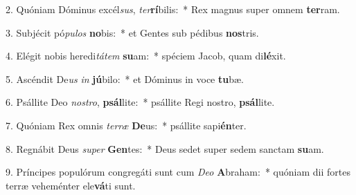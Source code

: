 2. Quóniam Dóminus excél\textit{sus}, \textit{ter}\textbf{rí}bilis:~*  Rex magnus super omnem \textbf{ter}ram.\

3. Subjécit pó\textit{pu}\textit{los} \textbf{no}bis:~*  et Gentes sub pédibus \textbf{nos}tris.\

4. Elégit nobis heredi\textit{tá}\textit{tem} \textbf{su}am:~*  spéciem Jacob, quam di\textbf{lé}xit.\

5. Ascéndit De\textit{us} \textit{in} \textbf{jú}bilo:~*  et Dóminus in voce \textbf{tu}bæ.\

6. Psállite Deo \textit{nos}\textit{tro}, \textbf{psál}lite:~*  psállite Regi nostro, \textbf{psál}lite.\

7. Quóniam Rex omnis \textit{ter}\textit{ræ} \textbf{De}us:~*  psállite sapi\textbf{én}ter.\

8. Regnábit Deus \textit{su}\textit{per} \textbf{Gen}tes:~*  Deus sedet super sedem sanctam \textbf{su}am.\

9. Príncipes populórum congregáti sunt cum \textit{De}\textit{o} \textbf{A}braham:~*  quóniam dii fortes terræ veheménter ele\textbf{vá}ti sunt.\

